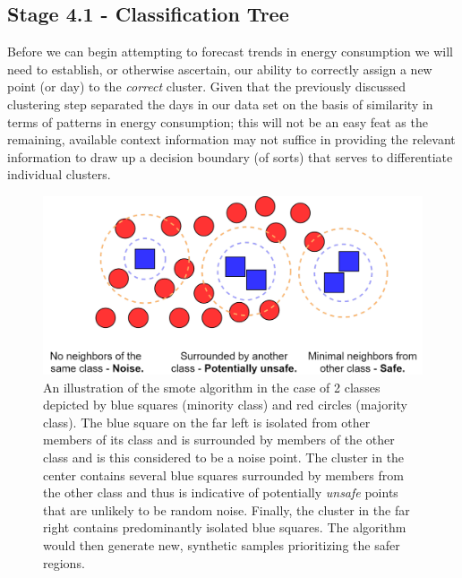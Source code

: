 \subsection{Stage 4.1 - Classification Tree}
\label{subsec:Methodology:Stage-4:Classification-Tree}
Before we can begin attempting to forecast trends in energy consumption we will need to establish, or otherwise ascertain, our ability to correctly assign a new point (or day) to the \textit{correct} cluster. Given that the previously discussed clustering step separated the days in our data set on the basis of similarity in terms of patterns in energy consumption; this will not be an easy feat as the remaining, available context information may not suffice in providing the relevant information to draw up a decision boundary (of sorts) that serves to differentiate individual clusters.

\begin{figure}[H]
    \centering
    \includegraphics[width=\textwidth]{Images/Chapter 6/Stage 4/Other/SMOTE.pdf}
    \caption{An illustration of the \gls{smote} algorithm in the case of 2 classes depicted by blue squares (minority class) and red circles (majority class). The blue square on the far left is isolated from other members of its class and is surrounded by members of the other class and is this considered to be a noise point. The cluster in the center contains several blue squares surrounded by members from the other class and thus is indicative of potentially \textit{unsafe} points that are unlikely to be random noise. Finally, the cluster in the far right contains predominantly isolated blue squares. The algorithm would then generate new, synthetic samples prioritizing the safer regions.}
    \label{fig:SMOTE}
\end{figure}

